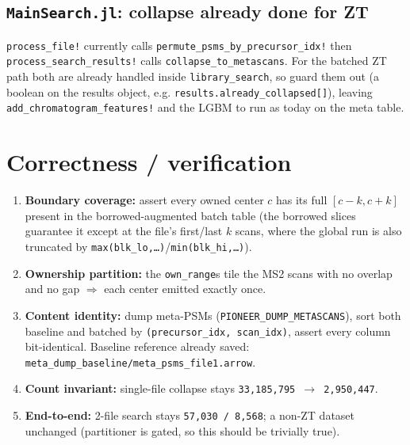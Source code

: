 \documentclass[11pt]{article}
\newcommand{\code}[1]{\texttt{\small #1}}
\begin{document}
\subsection{\code{MainSearch.jl}: collapse already done for ZT}
\code{process\_file!} currently calls \code{permute\_psms\_by\_precursor\_idx!} then
\code{process\_search\_results!} calls \code{collapse\_to\_metascans}. For the batched ZT
path both are already handled inside \code{library\_search}, so guard them out (a boolean
on the results object, e.g. \code{results.already\_collapsed[]}), leaving
\code{add\_chromatogram\_features!} and the LGBM to run as today on the meta table.

\section{Correctness / verification}
\begin{enumerate}[nosep]
  \item \textbf{Boundary coverage:} assert every owned center $c$ has its full $[c-k,c+k]$
    present in the borrowed-augmented batch table (the borrowed slices guarantee it except at
    the file's first/last $k$ scans, where the global run is also truncated by
    \code{max(blk\_lo,\dots)}/\code{min(blk\_hi,\dots)}).
  \item \textbf{Ownership partition:} the \code{own\_range}s tile the MS2 scans with no
    overlap and no gap $\Rightarrow$ each center emitted exactly once.
  \item \textbf{Content identity:} dump meta-PSMs (\code{PIONEER\_DUMP\_METASCANS}), sort
    both baseline and batched by \code{(precursor\_idx, scan\_idx)}, assert every column
    bit-identical. Baseline reference already saved:
    \code{meta\_dump\_baseline/meta\_psms\_file1.arrow}.
  \item \textbf{Count invariant:} single-file collapse stays \code{33{,}185{,}795 $\rightarrow$
    2{,}950{,}447}.
  \item \textbf{End-to-end:} 2-file search stays \code{57{,}030 / 8{,}568}; a non-ZT dataset
    unchanged (partitioner is gated, so this should be trivially true).
\end{enumerate}
\end{document}
